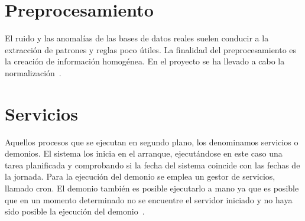 \section{Preprocesamiento}
El ruido y las anomalías de las bases de datos reales suelen conducir a la extracción de patrones y reglas poco útiles. La finalidad del preprocesamiento es la creación de información homogénea. En el proyecto se ha llevado a cabo la normalización~\cite{garcia_data_2015}.

\section{Servicios}
Aquellos procesos que se ejecutan en segundo plano, los denominamos servicios o demonios.
El sistema los inicia en el arranque, ejecutándose en este caso una tarea planificada y comprobando si la fecha del sistema coincide con las fechas de la jornada. Para la ejecución del demonio se emplea un gestor de servicios, llamado cron. El demonio también es posible ejecutarlo a mano ya que es posible que en un momento determinado no se encuentre el servidor iniciado y no haya sido posible la ejecución del demonio~\cite{servicios_linux_2013}.